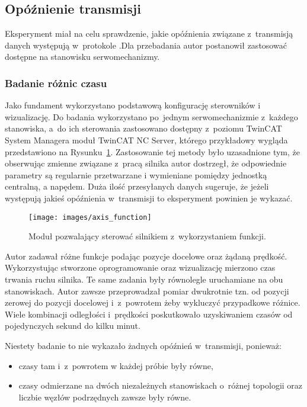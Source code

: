 \subsection{Opóźnienie transmisji}
Eksperyment miał na celu sprawdzenie, jakie opóźnienia związane z~transmisją danych występują w~protokole .Dla przebadania autor postanowił zastosować dostępne na stanowisku serwomechanizmy. 
\subsubsection{Badanie różnic czasu}
Jako fundament wykorzystano podstawową konfigurację sterowników i wizualizację. Do badania wykorzystano po~jednym serwomechanizmie z~każdego stanowiska, a~do ich sterowania zastosowano dostępny z~poziomu TwinCAT System Managera moduł TwinCAT NC Server, którego przykładowy wygląda przedstawiono na Rysunku~\ref{axis_function}. Zastosowanie tej metody było uzasadnione tym, że obserwując zmienne związane z~pracą silnika autor dostrzegł, że odpowiednie parametry są regularnie przetwarzane i wymieniane pomiędzy jednostką centralną, a napędem. Duża ilość przesyłanych danych sugeruje, że jeżeli występują jakieś opóźnienia w~transmisji to eksperyment powinien je wykazać.

\begin{figure}[!htb] 	\centering 	\texttt{[image: images/axis\_function]} \caption{Moduł pozwalający sterować silnikiem z~wykorzystaniem funkcji.} \label{axis_function} \end{figure}

Autor zadawał różne funkcje podając pozycje docelowe oraz żądaną prędkość. Wykorzystując stworzone oprogramowanie oraz wizualizację mierzono czas trwania ruchu silnika. Te same zadania były równolegle uruchamiane na obu stanowiskach. Autor zawsze przeprowadzał pomiar dwukrotnie tzn. od pozycji zerowej do pozycji docelowej i~z~powrotem żeby wykluczyć przypadkowe różnice. Wiele kombinacji odległości i~prędkości poskutkowało uzyskiwaniem czasów od pojedynczych sekund do kilku minut. 

\noindent Niestety badanie to nie wykazało żadnych opóźnień w~transmisji, ponieważ:
\begin{itemize}
\item czasy tam i~z~powrotem w każdej próbie były równe,
\item czasy odmierzane na dwóch niezależnych stanowiskach o~różnej topologii oraz liczbie węzłów podrzędnych zawsze były równe.
\end{itemize}

